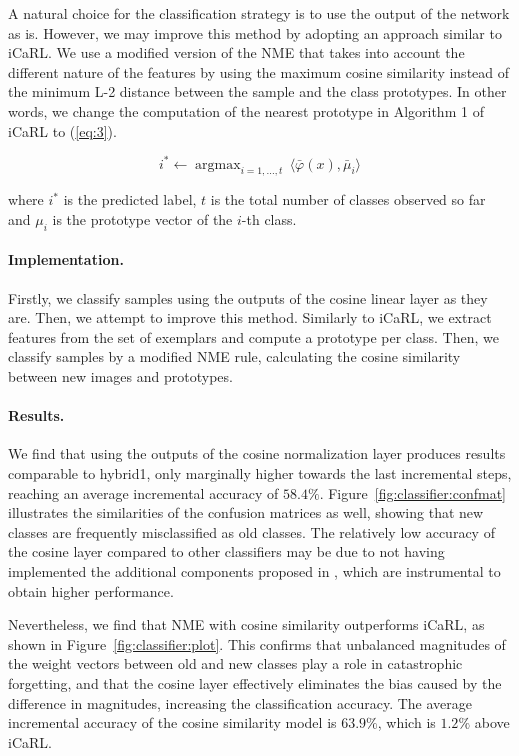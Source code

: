 \documentclass[10pt,twocolumn,letterpaper]{article}
\DeclareMathOperator*{\argmax}{argmax}
\begin{document}
A natural choice for the classification strategy is to use the output of the network as is. However, we may improve this method by adopting an approach similar to iCaRL. We use a modified version of the NME that takes into account the different nature of the features by using the maximum cosine similarity instead of the minimum L-2 distance between the sample and the class prototypes. In other words, we change the computation of the nearest prototype in Algorithm 1 of iCaRL to (\ref{eq:3}).

\begin{equation}
    i^{*} \gets \argmax_{i=1, \dots, t}\, \langle \bar{\varphi}(x), \bar{\mu}_{i} \rangle \label{eq:3}
\end{equation}

where $i^{*}$ is the predicted label, $t$ is the total number of classes observed so far and $\mu_{i}$ is the prototype vector of the $i$-th class.

\paragraph{Implementation.} Firstly, we classify samples using the outputs of the cosine linear layer as they are. Then, we attempt to improve this method. Similarly to iCaRL, we extract features from the set of exemplars and compute a prototype per class. Then, we classify samples by a modified NME rule, calculating the cosine similarity between new images and prototypes.

\paragraph{Results.} We find that using the outputs of the cosine normalization layer produces results comparable to hybrid1, only marginally higher towards the last incremental steps, reaching an average incremental accuracy of $58.4\%$. Figure~\ref{fig:classifier:confmat} illustrates the similarities of the confusion matrices as well, showing that new classes are frequently misclassified as old classes. The relatively low accuracy of the cosine layer compared to other classifiers may be due to not having implemented the additional components proposed in \cite{hou:2019}, which are instrumental to obtain higher performance.

Nevertheless, we find that NME with cosine similarity outperforms iCaRL, as shown in Figure~\ref{fig:classifier:plot}. This confirms that unbalanced magnitudes of the weight vectors between old and new classes play a role in catastrophic forgetting, and that the cosine layer effectively eliminates the bias caused by the difference in magnitudes, increasing the classification accuracy. The average incremental accuracy of the cosine similarity model is $63.9\%$, which is $1.2\%$ above iCaRL.
\end{document}
